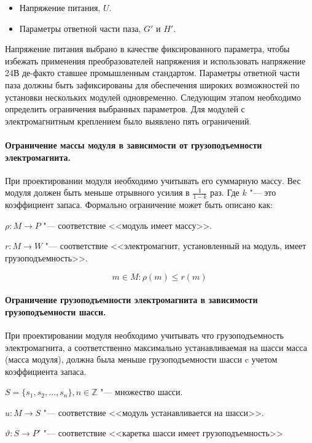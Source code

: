 \begin{itemize}
	\item Напряжение питания, $U$.
	\item Параметры ответной части паза, $G'$ и $H'$.
\end{itemize}

Напряжение питания выбрано в качестве фиксированного параметра, чтобы избежать применения преобразователей напряжения и использовать напряжение 24\:В де-факто ставшее промышленным стандартом. Параметры ответной части паза должны быть зафиксированы для обеспечения  широких возможностей по установки нескольких модулей одновременно. Следующим этапом необходимо определить ограничения выбранных параметров. Для модулей с электромагнитным креплением было выявлено пять ограничений.

\paragraph{Ограничение массы модуля в зависимости от грузоподъемности электромагнита.} При проектировании модуля необходимо учитывать его суммарную массу. Вес модуля должен быть меньше отрывного усилия в $\frac{1}{1-k}$ раз. Где $k$ "--- это коэффициент запаса. Формально ограничение может быть описано как:

\noindent $\rho : M \rightarrow P$ "--- соответствие <<модуль имеет массу>>.

\noindent $r : M \rightarrow W$ "--- соответствие <<электромагнит, установленный на модуль, имеет грузоподъемность>>.

\[
m \in M: \rho(m) \leq r(m)
\]

\paragraph{Ограничение грузоподъемности электромагнита в зависимости грузоподъемности шасси.} При проектировании модуля необходимо учитывать что грузоподъемность электромагнита, а соответственно максимально устанавливаемая на шасси масса (масса модуля), должна была меньше грузоподъемности шасси c учетом коэффициента запаса.

\noindent $S = \{s_1, s_2, \ldots, s_n\}, n \in \mathbb{Z}$ "--- множество шасси.

\noindent $u: M \rightarrow S$ "--- соответствие <<модуль устанавливается  на шасси>>. 

\noindent $\vartheta: S \rightarrow P'$ "--- соответствие <<каретка шасси имеет грузоподъемность>> 

